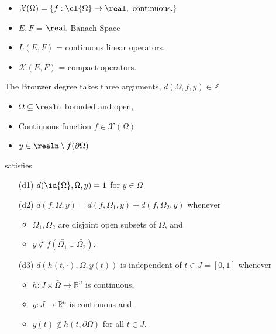 \documentclass[../main-v2-manifolds.tex]{subfiles}
\begin{document}
\begin{definition}
    \begin{itemize}
        \item $\mathcal{X}(\Omega) = \{f:\cl{\Omega}\to\real,\ \text{continuous.}\}$
        \item $E,F$ = $\real$ Banach Space
        \item $L(E,F)$ = continuous linear operators.
        \item $\mathcal{K}(E,F)$ = compact operators.
    \end{itemize}
    
\end{definition}
\begin{definition}
The Brouwer degree takes three arguments, $d(\Omega,f,y)\in\mathbb{Z}$
\begin{itemize}
    \item $\Omega\subseteq \realn$ bounded and open, 
    \item Continuous function $f\in \mathcal{X}(\Omega)$
    \item $y\in\realn\setminus f(\partial\Omega)$
\end{itemize}
satisfies
\begin{itemize}
    \item[(d1)] $d(\id{\Omega}, \Omega, y) = 1$ for $y \in \Omega$
    \item[(d2)] $d(f, \Omega, y) = d(f, \Omega_1, y) + d(f, \Omega_2, y)$ whenever 
    \begin{itemize}[label=\textbullet]
        \item $\Omega_1, \Omega_2$ are disjoint open subsets of $\Omega$, and 
        \item $y \notin f(\bar{\Omega_1} \cup \bar{\Omega_2})$.
    \end{itemize}
    \item[(d3)] $d(h(t, \cdot), \Omega, y(t))$ is independent of $t \in J = [0, 1]$ whenever 
    \begin{itemize}[label=\textbullet]
        \item $h: J \times \bar{\Omega} \rightarrow \mathbb{R}^n$ is continuous, 
        \item $y: J \rightarrow \mathbb{R}^n$ is continuous and 
        \item $y(t) \notin h(t, \partial \Omega)$ for all $t \in J$.
    \end{itemize}
\end{itemize}
\end{definition}
\end{document}
